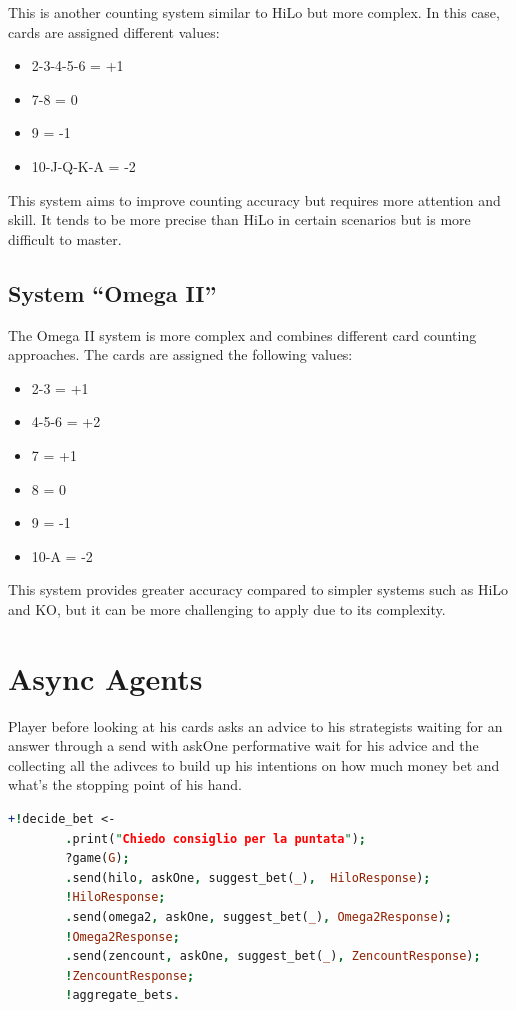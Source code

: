 This is another counting system similar to HiLo but more complex. In this case, cards are assigned different values:

\begin{itemize}
    \item 2-3-4-5-6 = +1
    \item 7-8 = 0
    \item 9 = -1
    \item 10-J-Q-K-A = -2
\end{itemize}

This system aims to improve counting accuracy but requires more attention and skill. It tends to be more precise than HiLo in certain scenarios but is more difficult to master.

\subsection{System ``Omega II''}

The Omega II system is more complex and combines different card counting approaches. The cards are assigned the following values:

\begin{itemize}
    \item 2-3 = +1
    \item 4-5-6 = +2
    \item 7 = +1
    \item 8 = 0
    \item 9 = -1
    \item 10-A = -2
\end{itemize}

This system provides greater accuracy compared to simpler systems such as HiLo and KO, but it can be more challenging to apply due to its complexity.

\section{Async Agents}

Player before looking at his cards asks an advice to his strategists waiting for an answer through a send with askOne performative wait for his advice and the collecting all the adivces to build up his intentions on how much money bet and what's the stopping point of his hand.

\begin{lstlisting}[language=Prolog]
    +!decide_bet <-
        .print("Chiedo consiglio per la puntata");
        ?game(G);
        .send(hilo, askOne, suggest_bet(_),  HiloResponse);
        !HiloResponse;
        .send(omega2, askOne, suggest_bet(_), Omega2Response);
        !Omega2Response;
        .send(zencount, askOne, suggest_bet(_), ZencountResponse);
        !ZencountResponse;
        !aggregate_bets.
\end{lstlisting}

